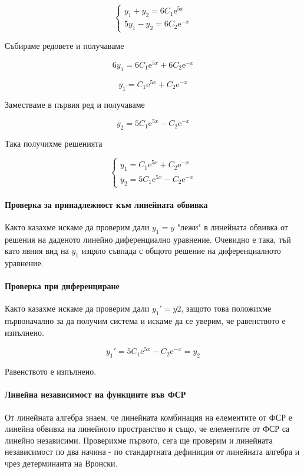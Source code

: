 \documentclass{scrartcl}
\begin{document}
$$
\begin{cases}
    y_1 + y_2 = 6C_1\mathrm{e}^{5x}\\
    5y_1 - y_2 = 6C_2\mathrm{e}^{-x}
\end{cases}
$$

Събираме редовете и получаваме

$$6y_1 = 6C_1\mathrm{e}^{5x} + 6C_2\mathrm{e}^{-x}$$

$$y_1 = C_1\mathrm{e}^{5x} + C_2\mathrm{e}^{-x}$$

Заместваме в първия ред и получаваме

$$y_2 = 5C_1\mathrm{e}^{5x} - C_2\mathrm{e}^{-x}$$

Така получихме решенията

$$
\begin{cases}
    y_1 = C_1\mathrm{e}^{5x} + C_2\mathrm{e}^{-x}\\
    y_2 = 5C_1\mathrm{e}^{5x} - C_2\mathrm{e}^{-x}
\end{cases}
$$

\paragraph{Проверка за принадлежност към линейната обвивка}

Както казахме искаме да проверим дали $y_1 = y$ "лежи" в линейната обвивка от решения на даденото линейно диференциално уравнение. Очевидно е така, тъй като явния вид на $y_1$ изцяло съвпада с общото решение на диференциалното уравнение.

\paragraph{Проверка при диференциране}

Както казахме искаме да проверим дали $y_1' = y2$, защото това положихме първоначално за да получим система и искаме да се уверим, че равенството е изпълнено.

$$y_1' = 5C_1\mathrm{e}^{5x} - C_2\mathrm{e}^{-x} = y_2$$

Равенството е изпълнено.

\paragraph{Линейна независимост на функциите във ФСР}

От линейната алгебра знаем, че линейната комбинация на елементите от ФСР е линейна обвивка на линейното пространство и също, че елементите от ФСР са линейно независими. Проверихме първото, сега ще проверим и линейната независимост по два начина - по стандартната дефиниция от линейната алгебра и чрез детерминанта на Вронски.
\end{document}
